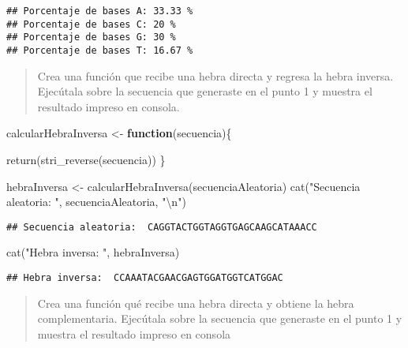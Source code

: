 \documentclass[
]{article}
\newenvironment{Shaded}{\begin{snugshade}}{\end{snugshade}}
\newcommand{\ControlFlowTok}[1]{\textcolor[rgb]{0.13,0.29,0.53}{\textbf{#1}}}
\newcommand{\FunctionTok}[1]{\textcolor[rgb]{0.00,0.00,0.00}{#1}}
\newcommand{\NormalTok}[1]{#1}
\newcommand{\OtherTok}[1]{\textcolor[rgb]{0.56,0.35,0.01}{#1}}
\newcommand{\SpecialCharTok}[1]{\textcolor[rgb]{0.00,0.00,0.00}{#1}}
\newcommand{\StringTok}[1]{\textcolor[rgb]{0.31,0.60,0.02}{#1}}
\begin{document}
\begin{verbatim}
## Porcentaje de bases A: 33.33 %
## Porcentaje de bases C: 20 %
## Porcentaje de bases G: 30 %
## Porcentaje de bases T: 16.67 %
\end{verbatim}

\begin{quote}
Crea una función que recibe una hebra directa y regresa la hebra
inversa. Ejecútala sobre la secuencia que generaste en el punto 1 y
muestra el resultado impreso en consola.
\end{quote}

\begin{Shaded}
\begin{Highlighting}[]
\NormalTok{calcularHebraInversa }\OtherTok{\textless{}{-}} \ControlFlowTok{function}\NormalTok{(secuencia)\{}
  
  \FunctionTok{return}\NormalTok{(}\FunctionTok{stri\_reverse}\NormalTok{(secuencia))}
\NormalTok{\}}

\NormalTok{hebraInversa }\OtherTok{\textless{}{-}} \FunctionTok{calcularHebraInversa}\NormalTok{(secuenciaAleatoria)}
\FunctionTok{cat}\NormalTok{(}\StringTok{"Secuencia aleatoria: "}\NormalTok{, secuenciaAleatoria, }\StringTok{"}\SpecialCharTok{\textbackslash{}n}\StringTok{"}\NormalTok{)}
\end{Highlighting}
\end{Shaded}

\begin{verbatim}
## Secuencia aleatoria:  CAGGTACTGGTAGGTGAGCAAGCATAAACC
\end{verbatim}

\begin{Shaded}
\begin{Highlighting}[]
\FunctionTok{cat}\NormalTok{(}\StringTok{"Hebra inversa: "}\NormalTok{, hebraInversa)}
\end{Highlighting}
\end{Shaded}

\begin{verbatim}
## Hebra inversa:  CCAAATACGAACGAGTGGATGGTCATGGAC
\end{verbatim}

\begin{quote}
Crea una función qué recibe una hebra directa y obtiene la hebra
complementaria. Ejecútala sobre la secuencia que generaste en el punto 1
y muestra el resultado impreso en consola
\end{quote}
\end{document}

